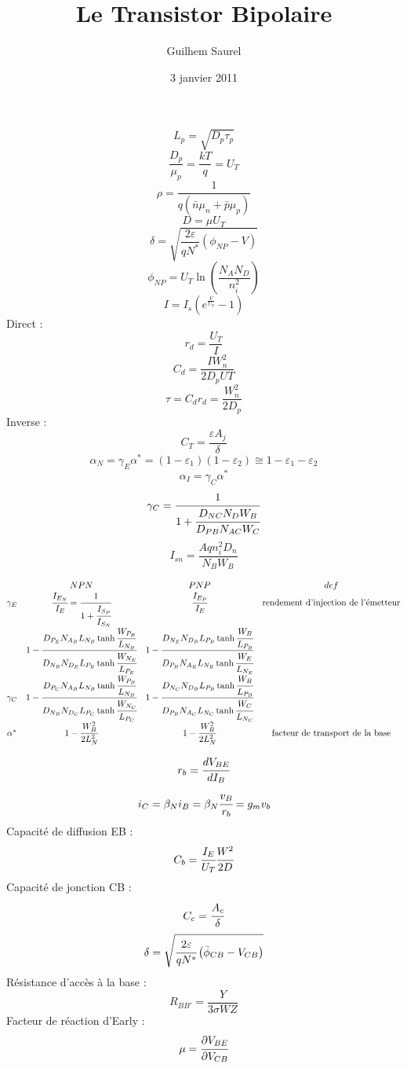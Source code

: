 \documentclass{article}
\title{Le Transistor Bipolaire}
\author{Guilhem Saurel}
\date{3 janvier 2011}
\begin{document}
$$L_{p} = \sqrt{D_{p}\tau_{p}}$$
$$\frac{D_{p}}{\mu_{p}} = \frac{kT}{q} = U_{T}$$
$$\rho = \frac{1}{q(\bar{n}\mu_{n}+\bar{p}\mu_{p})}$$
$$D=\mu U_{T}$$
$$\delta=\sqrt{\frac{2\varepsilon}{qN^{*}}\left(\phi_{NP}-V\right)}$$
$$\phi_{NP} = U_{T}\ln\left(\frac{N_{A}N_{D}}{n_{i}^{2}}\right)$$
$$I=I_{s}\left(e^{\frac{V}{U_{T}}}-1\right)$$
Direct : 
$$r_{d}=\frac{U_{T}}{I}$$
$$C_{d} = \frac{IW_{n}^{2}}{2D_{p}U{T}}$$
$$\tau = C_{d}r_{d} = \frac{W_{n}^{2}}{2D_{p}}$$
Inverse : 
$$C_{T} = \frac{\varepsilon A_{j}}{\delta}$$
$$\alpha_{N}=\gamma_{E}\alpha^{*}=\left(1-\varepsilon_{1}\right)\left(1-\varepsilon_{2}\right)\cong 1-\varepsilon_{1}-\varepsilon_{2}$$
$$\alpha_{I}=\gamma_{C}\alpha^{*}$$
$$\gamma_{C} = \cfrac{1}{1+\cfrac{D_{NC}N_{D}W_{B}}{D_{PB}N_{AC}W_{C}}}$$
$$I_{sn}=\frac{Aqn_{i}^{2}D_{n}}{N_{B}W_{B}}$$

$$
\begin{matrix}
&NPN&PNP&def\\
\gamma_{E}&\cfrac{I_{E_{N}}}{I_{E}}=\cfrac{1}{1+\cfrac{I_{S_{P}}}{I_{S_{N}}}}&\cfrac{I_{E_{P}}}{I_{E}}&\text{rendement d'injection de l'émetteur}\\
&1-\cfrac{D_{P_{E}}N_{A_{B}}L_{N_{B}}\tanh\cfrac{W_{P_{B}}}{L_{N_{B}}}}{D_{N_{B}}N_{D_{E}}L_{P_{E}}\tanh\cfrac{W_{N_{E}}}{L_{P_{E}}}}&1-\cfrac{D_{N_{E}}N_{D_{B}}L_{P_{B}}\tanh\cfrac{W_{B}}{L_{P_{B}}}}{D_{P_{B}}N_{A_{E}}L_{N_{E}}\tanh\cfrac{W_{E}}{L_{N_{E}}}}&\\
\gamma_{C}&1-\cfrac{D_{P_{C}}N_{A_{B}}L_{N_{B}}\tanh\cfrac{W_{P_{B}}}{L_{N_{B}}}}{D_{N_{B}}N_{D_{C}}L_{P_{C}}\tanh\cfrac{W_{N_{C}}}{L_{P_{C}}}}&1-\cfrac{D_{N_{C}}N_{D_{B}}L_{P_{B}}\tanh\cfrac{W_{B}}{L_{P_{B}}}}{D_{P_{B}}N_{A_{C}}L_{N_{C}}\tanh\cfrac{W_{C}}{L_{N_{C}}}}&\\
\alpha^{*}&1-\cfrac{W_{B}^{2}}{2L_{N}^{2}}&1-\cfrac{W_{B}^{2}}{2L_{N}^{2}}&\text{facteur de transport de la base}\\
\end{matrix}
$$

$$r_{b}=\cfrac{dV_{BE}}{dI_{B}}$$
$$i_{C}=\beta_{N}i_{B}=\beta_{N}\cfrac{v_{B}}{r_{b}}=g_{m}v_{b}$$
Capacité de diffusion EB : $$C_{b}=\cfrac{I_{E}}{U_{T}}\cfrac{W^{2}}{2D}$$
Capacité de jonction CB : $$C_{c}=\cfrac{A_{c}}{\delta}$$
$$\delta=\sqrt{\cfrac{2\varepsilon}{qN^{*}}\left(\bar\phi_{CB}-V_{CB}\right)}$$
Résistance d'accès à la base : $$R_{BB'}=\frac{Y}{3\sigma WZ}$$
Facteur de réaction d'Early : $$\mu=\cfrac{\partial V_{BE}}{\partial V_{CB}}$$
\end{document}
